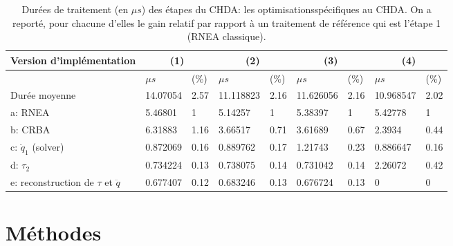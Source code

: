 \documentclass[10pt]{beamer}
\begin{document}
\begin{frame}
\begin{flushleft}
	\begin{table}[H]
	\begin{center}
	\begin{tabular}[H]{|l|l|l|l|l|l|l|l|l|}
	\hline
	Version d'implémentation                   & \multicolumn{2}{c|}{(1)}  & \multicolumn{2}{c|}{(2)} & \multicolumn{2}{c|}{(3)} & \multicolumn{2}{c|}{(4)} \\ \hline \hline
	                                           & $\mu s$      & (\%)      & $\mu s$     & (\%)   & $\mu s$     & (\%)   & $\mu s$   & (\%) \\ \hline
	Durée moyenne                              & 14.07054     & 2.57      & 11.118823   & 2.16   & 11.626056   & 2.16   & 10.968547 & 2.02 \\
	a: RNEA                                    & 5.46801      & 1         & 5.14257     & 1      & 5.38397     & 1      & 5.42778   & 1    \\
	b: CRBA                                    & 6.31883      & 1.16      & 3.66517     & 0.71   & 3.61689     & 0.67   & 2.3934    & 0.44 \\
	c: $\ddot{q}_1$ (solver)                   & 0.872069     & 0.16      & 0.889762    & 0.17   & 1.21743     & 0.23   & 0.886647  & 0.16 \\
	d: $\tau_2$                                & 0.734224     & 0.13      & 0.738075    & 0.14   & 0.731042    & 0.14   & 2.26072   & 0.42 \\
	e: reconstruction de $\tau$ et $\ddot{q}$  & 0.677407     & 0.12      & 0.683246    & 0.13   & 0.676724    & 0.13   & 0         & 0    \\
	\hline
	\end{tabular}
	\caption[Table caption text]{Durées de traitement (en $\mu s$) des étapes du CHDA: les optimisationsspécifiques au CHDA. On a reporté, pour chacune d'elles le gain relatif par rapport à un traitement de référence qui est l'étape 1 (RNEA classique).}
	\label{table:performancesOptimSpecifCHDA}
	\end{center}
	\end{table}
	
	\end{flushleft}
	
	
\end{frame}

\section{Méthodes}
\end{document}
